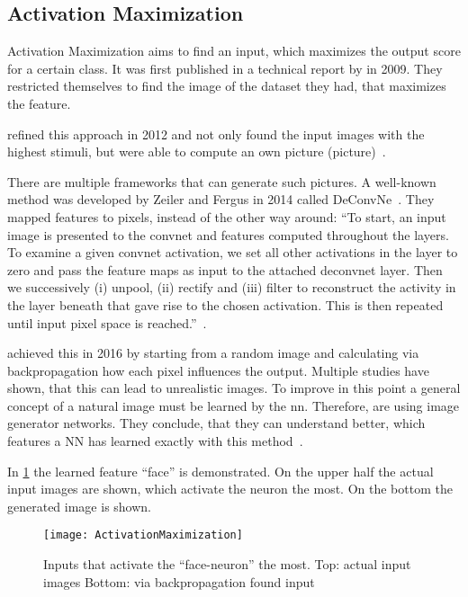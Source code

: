 \subsection{Activation Maximization}
Activation Maximization aims to find an input, which maximizes the output score for a certain class. It was first published in a technical report by  in 2009. They restricted themselves to find the image of the dataset they had, that maximizes the feature.
\par
{} refined this approach in 2012 and not only found the input images with the highest stimuli, but were able to compute an own picture (picture)~\cite{Le.2012}.
\par
There are multiple frameworks that can generate such pictures. A well-known method was developed by Zeiler and Fergus in 2014 called DeConvNe~\cite{Zeiler.2014}. They mapped features to pixels, instead of the other way around:
“To start, an input image is presented to the convnet and features computed throughout the layers. To examine a given convnet activation, we set all other activations in the layer to zero and pass the feature maps as input to the attached deconvnet layer. Then we successively (i) unpool, (ii) rectify and (iii) filter to reconstruct the activity in the layer beneath that gave rise to the chosen activation. This is then repeated until input pixel space is reached.”~\cite[820]{Zeiler.2014}.
\par
{} achieved this in 2016 by starting from a random image and calculating via backpropagation how each pixel influences the output. Multiple studies have shown, that this can lead to unrealistic images. To improve in this point a general concept of a natural image must be learned by the \gls{nn}. Therefore, \citeauthor{Nguyen.2016} are using image generator networks. They conclude, that they can understand better, which features a NN has learned exactly with this method~\cite{Nguyen.2016}. 
\par
In \cref{fig:ActivationMax} the learned feature “face” is demonstrated. On the upper half the actual input images are shown, which activate the neuron the most. On the bottom the generated image is shown.
\begin{figure}
    \center{}
    \texttt{[image: ActivationMaximization]}
    \caption{Inputs that activate the “face-neuron” the most.
    Top: actual input images 
    Bottom: via backpropagation found input~\cite{Le.2012}}\label{fig:ActivationMax}
\end{figure}